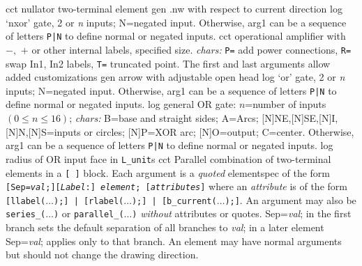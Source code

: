   {cct}
  { nullator two-terminal element }
  {gen}
  {.nw with respect to current direction}
  {log}
  {`nxor' gate, 2 or {\sl n\/} inputs; N=negated input.
   Otherwise, arg1 can be a sequence of letters {\tt P|N}
   to define normal or negated inputs.
    }
  {cct}
  {operational amplifier with $-,$ $+$ or other internal labels,
    specified size. {\sl chars:} {\tt P=} add power connections,
    {\tt R=} swap In1, In2 labels,
    {\tt T=} truncated point.
    The first and last arguments allow added customizations 
   }
  {gen}
  {arrow with adjustable open head}
  {log}
  {`or' gate, 2 or {\sl n\/} inputs; N=negated input.
   Otherwise, arg1 can be a sequence of letters {\tt P|N}
   to define normal or negated inputs.
    }
  {log}
  {general OR gate: $n$=number of inputs $(0\leq n\leq 16)$;
    {\sl chars:} B=base and straight sides; A=Arcs;
           [N]NE,[N]SE,[N]I,[N]N,[N]S=inputs or circles;
           [N]P=XOR arc; [N]O=output; C=center.
   Otherwise, arg1 can be a sequence of letters {\tt P|N}
   to define normal or negated inputs.}
  {log}
  {radius of OR input face in {\tt L\_unit}s}
  {cct}
  { Parallel combination of two-terminal elements in a {\tt [ ]} block.
    Each argument is a {\em quoted} elementspec of the form
    {\tt[Sep={\sl val};][{\sl Label}:] {\sl element}; [{\sl attributes}]}
    where an {\sl attribute} is of the form
    {\tt[llabel($\ldots$);] | [rlabel($\ldots$);] | [b\_current($\ldots$);]}.
    An argument may also be {\tt series\_($\ldots$)} or
    {\tt parallel\_($\ldots$)} {\em without} attributes or quotes. 
    Sep={\sl val}; in the first branch sets the default
    separation of all branches to {\sl val}; in a later
    element Sep={\sl val}; applies only to that branch.
    An element may have normal arguments but should
    not change the drawing direction.
   }
